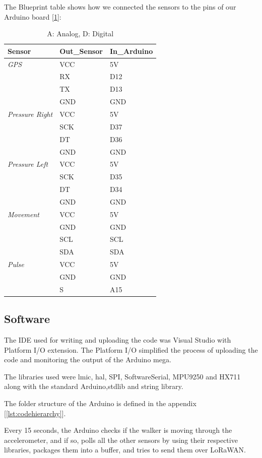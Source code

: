		The Blueprint table shows how we connected the sensors to the pins of our Arduino board [\ref{tab:blueprintArduino}]:
		\begin{table}[h!]
			\centering
			\begin{tabular}{l|ll}
				\textbf{Sensor} & \textbf{Out\_Sensor} & \textbf{In\_Arduino} \\\hline
				\textit{GPS} & VCC & 5V \\
				& RX & D12 \\
				& TX & D13 \\
				& GND & GND \\\hline
				\textit{Pressure Right} & VCC & 5V \\
				& SCK & D37 \\
				& DT & D36 \\
				& GND & GND \\\hline
				\textit{Pressure Left} & VCC & 5V \\
				& SCK & D35 \\
				& DT & D34 \\
				& GND & GND \\\hline
				\textit{Movement} & VCC & 5V \\
				& GND & GND \\
				& SCL & SCL \\
				& SDA & SDA \\\hline
				\textit{Pulse} & VCC & 5V \\
				& GND & GND \\
				& S & A15 
			\end{tabular}
			\caption[Blueprint connections node]{A: Analog, D: Digital}
			\label{tab:blueprintArduino}
		\end{table}

	\subsection*{Software}
		The IDE used for writing and uploading the code was Visual Studio with Platform I/O extension. The Platform I/O simplified the process of uploading the code and monitoring the output of the Arduino mega.

		The libraries used were lmic, hal, SPI, SoftwareSerial, MPU9250 and HX711 along with the standard Arduino,stdlib and string library.

		The folder structure of the Arduino is defined in the appendix [\ref{lst:codehierarchy}]. 

		Every 15 seconds, the Arduino checks if the walker is moving through the accelerometer, and if so, polls all the other sensors by using their respective libraries, packages them into a buffer, and tries to send them over LoRaWAN.

